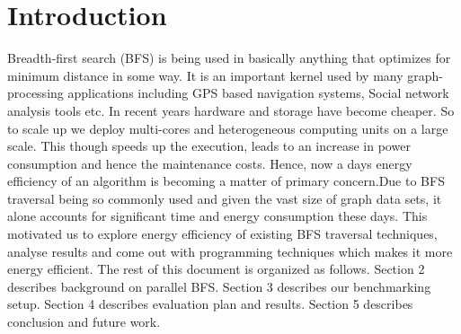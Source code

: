 \section{Introduction}
\label{intro}

Breadth-first search (BFS) is being used in basically anything that
optimizes for minimum distance in some way.  It is an important kernel
used by many graph-processing applications including GPS based
navigation systems, Social network analysis tools etc.\newline
In recent years hardware and storage have become cheaper. So to scale
up we deploy multi-cores and heterogeneous computing units on a large
scale. This though speeds up the execution, leads to an increase in
power consumption and hence the maintenance costs. Hence, now a days
energy efficiency of an algorithm is becoming a matter of primary
concern.\newline Due to BFS traversal being so commonly used and given
the vast size of graph data sets, it alone accounts for significant
time and energy consumption these days.  This motivated us to explore
energy efficiency of existing BFS traversal techniques, analyse
results and come out with programming techniques which makes it more
energy efficient.\newline
The rest of this document is organized as follows.  Section 2
describes background on parallel BFS.  Section 3 describes our
benchmarking setup.  Section 4 describes evaluation plan and results.
Section 5 describes conclusion and future work.

